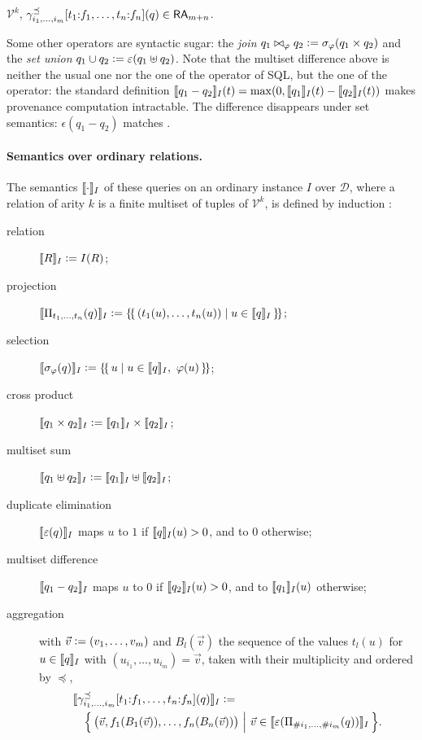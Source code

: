 \begin{toappendix}
\begin{description}
      $\mathcal V^k$,
      $\gamma^{\preceq}_{i_1,\dots,i_m}[t_1{:}f_1,\dots,t_n{:}f_n](q)\in\RA_{m+n}$.
  \end{description}
  Some other operators are syntactic sugar:
  the \emph{join} $q_1\bowtie_\phi q_2 \defeq \sigma_\phi(q_1\times q_2)$ and
  the \emph{set union} $q_1\cup q_2\defeq \epsilon(q_1\uplus q_2)$.
  Note that the multiset difference above is neither the usual one nor
  the one of the  operator of SQL, but the one of the
   operator: the standard definition
  $\ansem{I}{q_1-q_2}(t)=\max(0,\ansem{I}{q_1}(t)-\ansem{I}{q_2}(t))$
  makes provenance computation intractable. The difference disappears
  under set semantics: $\epsilon(q_1-q_2)$ matches .

  \paragraph*{Semantics over ordinary relations.} The semantics
  $\ansem{I}{\cdot}$ of these queries on an ordinary instance $I$
  over $\mathcal{D}$, where a relation of arity $k$ is a finite multiset
  of tuples of $\mathcal{V}^k$, is defined by induction
   :
  \begin{description}
    \item[relation] $\ansem{I}{R}\defeq I(R)$;
    \item[projection] $\ansem{I}{\Pi_{t_1,\dots,t_n}(q)}\defeq
      \mset{(t_1(u),\dots,t_n(u))\mid u\in\ansem{I}{q}}$;
    \item[selection] $\ansem{I}{\sigma_\phi(q)}\defeq
      \mset{u\mid u\in\ansem{I}{q},\ \phi(u)}$;
    \item[cross product] $\ansem{I}{q_1\times q_2} \defeq
      \ansem{I}{q_1}\times\ansem{I}{q_2}$;
    \item[multiset sum] $\ansem{I}{q_1\uplus
      q_2}\defeq\ansem{I}{q_1}\uplus\ansem{I}{q_2}$;
    \item[duplicate elimination] $\ansem{I}{\epsilon(q)}$ maps $u$ to $1$
      if $\ansem{I}{q}(u)>0$, and to $0$ otherwise;
    \item[multiset difference] $\ansem{I}{q_1-q_2}$ maps $u$ to $0$ if
      $\ansem{I}{q_2}(u)>0$, and to $\ansem{I}{q_1}(u)$ otherwise;
    \item[aggregation] with $\vec v\defeq(v_1,\dots,v_m)$ and
      $B_l(\vec v)$ the sequence of the values $t_l(u)$ for
      $u\in\ansem{I}{q}$ with $(u_{i_1},\dots,u_{i_m})=\vec v$, taken
      with their multiplicity and ordered by $\preceq$,
      \begin{align*}
        &\ansem{I}{\gamma^{\preceq}_{i_1,\dots,i_m}[t_1{:}f_1,\dots,t_n{:}f_n](q)}\defeq\\
        &\quad\Bigl\{\,\bigl(\vec v,f_1(B_1(\vec
        v)),\dots,f_n(B_n(\vec v))\bigr)\ \Big|\
        \vec v\in\ansem{I}{\epsilon(\Pi_{\#i_1,\dots,\#i_m}(q))}\,\Bigr\}.
      \end{align*}
  \end{description}


\end{toappendix}
